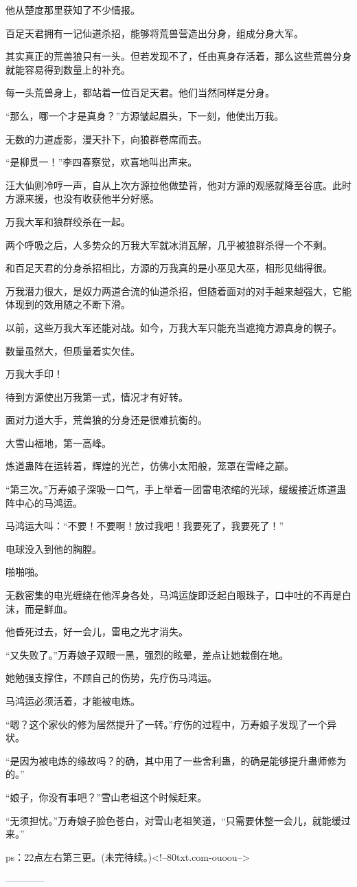 \begin{this_body}
他从楚度那里获知了不少情报。

百足天君拥有一记仙道杀招，能够将荒兽营造出分身，组成分身大军。

其实真正的荒兽狼只有一头。但若发现不了，任由真身存活着，那么这些荒兽分身就能容易得到数量上的补充。

每一头荒兽身上，都站着一位百足天君。他们当然同样是分身。

“那么，哪一个才是真身？”方源皱起眉头，下一刻，他使出万我。

无数的力道虚影，漫天扑下，向狼群卷席而去。

“是柳贯一！”李四春察觉，欢喜地叫出声来。

汪大仙则冷哼一声，自从上次方源拉他做垫背，他对方源的观感就降至谷底。此时方源来援，也没有收获他半分好感。

万我大军和狼群绞杀在一起。

两个呼吸之后，人多势众的万我大军就冰消瓦解，几乎被狼群杀得一个不剩。

和百足天君的分身杀招相比，方源的万我真的是小巫见大巫，相形见绌得很。

万我潜力很大，是奴力两道合流的仙道杀招，但随着面对的对手越来越强大，它能体现到的效用随之不断下滑。

以前，这些万我大军还能对战。如今，万我大军只能充当遮掩方源真身的幌子。

数量虽然大，但质量着实欠佳。

万我大手印！

待到方源使出万我第一式，情况才有好转。

面对力道大手，荒兽狼的分身还是很难抗衡的。

大雪山福地，第一高峰。

炼道蛊阵在运转着，辉煌的光芒，仿佛小太阳般，笼罩在雪峰之巅。

“第三次。”万寿娘子深吸一口气，手上举着一团雷电浓缩的光球，缓缓接近炼道蛊阵中心的马鸿运。

马鸿运大叫：“不要！不要啊！放过我吧！我要死了，我要死了！”

电球没入到他的胸膛。

啪啪啪。

无数密集的电光缠绕在他浑身各处，马鸿运旋即泛起白眼珠子，口中吐的不再是白沫，而是鲜血。

他昏死过去，好一会儿，雷电之光才消失。

“又失败了。”万寿娘子双眼一黑，强烈的眩晕，差点让她栽倒在地。

她勉强支撑住，不顾自己的伤势，先疗伤马鸿运。

马鸿运必须活着，才能被电炼。

“嗯？这个家伙的修为居然提升了一转。”疗伤的过程中，万寿娘子发现了一个异状。

“是因为被电炼的缘故吗？的确，其中用了一些舍利蛊，的确是能够提升蛊师修为的。”

“娘子，你没有事吧？”雪山老祖这个时候赶来。

“无须担忧。”万寿娘子脸色苍白，对雪山老祖笑道，“只需要休整一会儿，就能缓过来。”

ps：22点左右第三更。(未完待续。)<!--80txt.com-ouoou-->

------------

\end{this_body}

